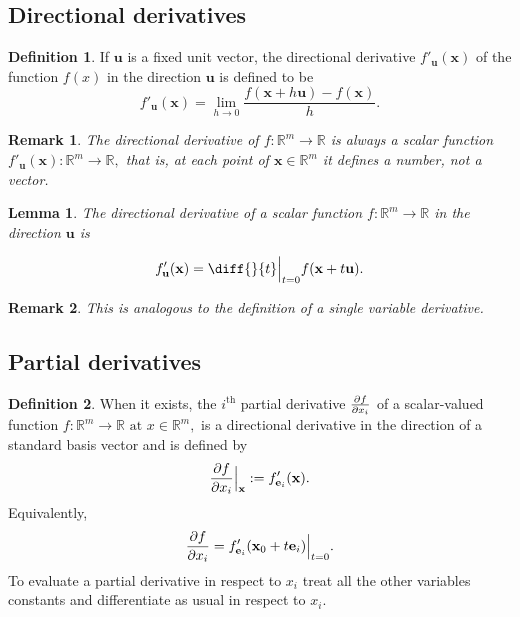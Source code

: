 \documentclass[12pt, a4paper]{article}
\newcommand{\bb}[1]{\mathbb{#1}}
\newtheorem*{remark}{Remark}
\theoremstyle{definition}
\newtheorem{definition}{Definition}[section]
\theoremstyle{plain}
\newtheorem{lemma}[theorem]{Lemma}
\begin{document}
\subsection{Directional derivatives}

\begin{definition}
If $\mathbf{u}$ is a fixed unit vector, the directional derivative $f'_\mathbf{u}(\mathbf{x})$ of the function $f(x)$ in the direction $\mathbf{u}$ is defined to be $$f'_\mathbf{u}(\mathbf{x})= \lim_{h \to 0} \frac{f(\mathbf{x}+h\mathbf{u})-f(\mathbf{x})}{h}.$$
\end{definition}

\begin{remark}
The directional derivative of $f : \bb{R}^m \to \bb{R}$ is always a scalar function $f'_\mathbf{u}(\mathbf{x}) : \bb{R}^m \to \bb{R},$ that is, at each point of $\mathbf{x} \in \bb{R}^m$ it defines a number, not a vector.
\end{remark}

\begin{lemma}
The directional derivative of a scalar function $f : \bb{R}^m \to \bb{R}$ in the direction $\mathbf{u}$ is 
\begin{tcolorbox}
$$f'_\mathbf{u}(\mathbf{x})=\diff{}{t} \Bigr|_{t=0} f(\mathbf{x}+t\mathbf{u}).$$
\end{tcolorbox}
\end{lemma}

\begin{remark}
This is analogous to the definition of a single variable derivative.
\end{remark}

\subsection{Partial derivatives}

\begin{definition}
When it exists, the $i^{\text{th}}$ partial derivative $\pdv{f}{x_i}$ of a scalar-valued function $f:\bb{R}^m \to \bb{R} \text{ at } x \in \bb{R}^m,$ is a directional derivative in the direction of a standard basis vector and is defined by $$\pdv{f}{x_i}\Bigr|_{\mathbf{x}}:=f'_{\mathbf{e}_i}(\mathbf{x}).$$ Equivalently, $$\pdv{f}{x_i}=f'_{\mathbf{e}_i}(\mathbf{x}_0+t\mathbf{e}_i)\Bigr|_{t=0}.$$ To evaluate a partial derivative in respect to $x_i$ treat all the other variables constants and differentiate as usual in respect to $x_i.$ 
\end{definition}
\end{document}
